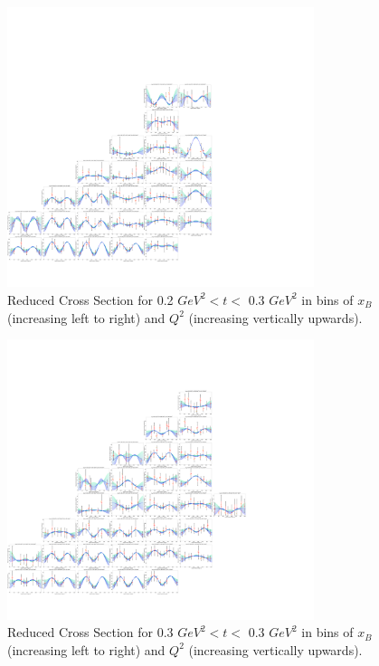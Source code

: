         \begin{figure}[ht]
            \centering
            \includegraphics[trim={14.6cm 4cm 27.2cm 4cm},clip,width=0.8\textwidth]{Chapters/Ch5-Further/c12xsec/combined_t0.2.png}
            \caption[Reduced Cross Section for 0.2 $GeV^2 < t <$ 0.3 $ GeV^2$]{Reduced Cross Section for 0.2 $ GeV^2 < t <$ 0.3 $GeV^2$ in bins of $x_B$ (increasing left to right) and $Q^2$ (increasing vertically upwards). }
            \label{fig:combined_t0.2}
        \end{figure}
    
        \begin{figure}[ht]
            \centering
            \includegraphics[trim={14.6cm 4cm 27.2cm 4cm},clip,width=0.8\textwidth]{Chapters/Ch5-Further/c12xsec/combined_t0.3.png}
            \caption[Reduced Cross Section for 0.3 $GeV^2 < t <$ 0.4 $ GeV^2$]{Reduced Cross Section for 0.3 $ GeV^2 < t <$ 0.3 $GeV^2$ in bins of $x_B$ (increasing left to right) and $Q^2$ (increasing vertically upwards). }
            \label{fig:combined_t0.3}
        \end{figure}
    
